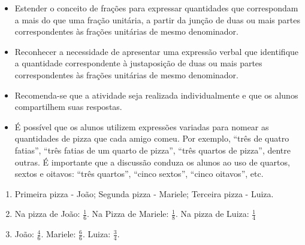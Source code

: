 \begin{multicols}{2}
\begin{objetivos}[code={\setcounter{tcb@cnt@objetivos}{0}}]{}{}  %
  \begin{itemize} %
\item Estender o conceito de frações para expressar quantidades que correspondam a mais do que uma fração unitária, a partir da junção de duas ou mais partes correspondentes às frações unitárias de mesmo denominador.
\item Reconhecer a necessidade de apresentar uma expressão verbal que identifique a quantidade correspondente à justaposição de duas ou mais partes correspondentes às frações unitárias de mesmo denominador.
  \end{itemize} %
\end{objetivos}

\begin{orientacoes}
  \begin{itemize} %
\item Recomenda-se que a atividade seja realizada individualmente e que os alunos compartilhem suas respostas. 
\item É possível que os alunos utilizem expressões variadas para nomear as quantidades de pizza que cada amigo comeu. Por exemplo, ``três de quatro fatias'', ``três fatias de um quarto de pizza'', ``três quartos de pizza'', dentre outras. É importante que a discussão conduza os alunos ao uso de quartos, sextos e oitavos: ``três quartos'', ``cinco sextos'', ``cinco oitavos'', etc. 
\end{itemize} %
\end{orientacoes}

\begin{solucao}[code={\setcounter{tcb@cnt@solucao}{0}}]{}{}
\begin{enumerate} [\quad a)] %
\item Primeira pizza - João; Segunda pizza - Mariele;  Terceira pizza - Luiza.
\item Na pizza de João: $\frac{1}{6}$. Na Pizza de Mariele: $\frac{1}{8}$. Na pizza de Luiza: $\frac{1}{4}$
\item João: $\frac{4}{6}$.  Mariele: $\frac{6}{6}$. Luiza: $\frac{3}{4}$.
\end{enumerate} %
\end{solucao}



\end{multicols}

